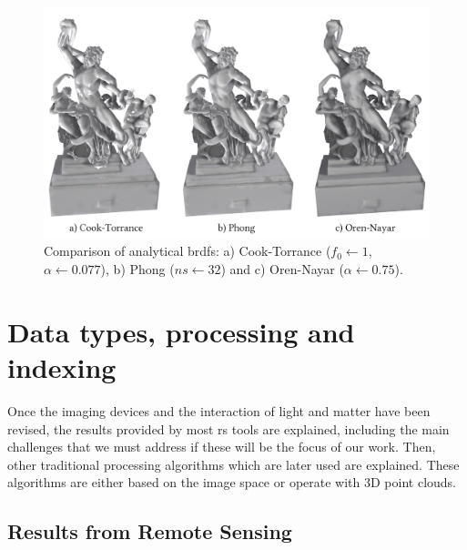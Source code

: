 

\begin{figure}[ht]
	\includegraphics[width=\textwidth]{figs/fundamentals/analytical_brdf.png}
	\caption{Comparison of analytical \acrshort{brdf}s: a) Cook-Torrance ($f_0 \gets 1$, $\alpha \gets 0.077$), b) Phong ($ns \gets 32$) and c) Oren-Nayar ($\alpha \gets 0.75$). }
    \label{fig:analytical_brdf}
\end{figure}


\section{Data types, processing and indexing}

Once the imaging devices and the interaction of light and matter have been revised, the results provided by most \acrshort{rs} tools are explained, including the main challenges that we must address if these will be the focus of our work. Then, other traditional processing algorithms which are later used are explained. These algorithms are either based on the image space or operate with 3D point clouds.

\subsection{Results from Remote Sensing}

